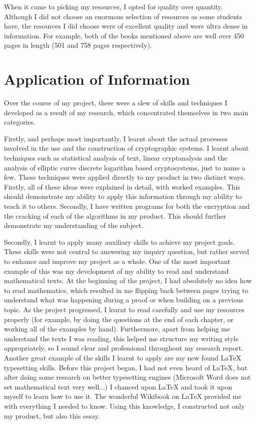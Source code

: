 \documentclass[12pt, a4paper, draft]{report}
\begin{document}
When it came to picking my resources, I opted for quality over quantity.
Although I did not choose an enormous selection of resources as some
students have, the resources I did choose were of excellent quality
and were ultra dense in information. For example, both of the books
mentioned above are well over 450 pages in length (501 and 758
pages respectively).

\section*{Application of Information}

Over the course of my project, there were a slew of skills and techniques
I developed as a result of my research, which concentrated themselves in
two main categories.

Firstly, and perhaps most importantly, I learnt about the actual processes
involved in the use and the construction of cryptographic systems. I
learnt about techniques such as statistical analysis of text, linear
cryptanalysis and the analysis of elliptic curve discrete logarithm based
cryptosystems, just to name a few. These techniques were applied directly
to my product in two distinct ways. Firstly, all of these ideas were explained in detail, with worked examples.
This should demonstrate my ability to apply this information through my
ability to teach it to others. Secondly, I have written programs for
both the encryption and the cracking of each of the algorithms in my
product. This should further demonstrate my understanding of the subject.

Secondly, I learnt to apply many auxiliary skills to achieve my project
goals. These skills were not central to answering my inquiry question, but
rather served to enhance and improve my project as a whole. One of the
most important example of this was my development of my ability to read
and understand mathematical texts. At the beginning of the project, I had
absolutely no idea how to read mathematics, which resulted in me flipping
back between pages trying to understand what was happening during a proof
or when building on a previous topic. As the project progressed, I learnt
to read carefully and use my resources properly (for example, by doing
the questions at the end of each chapter, or working all of the examples
by hand). Furthermore, apart from helping me understand the texts I was
reading, this helped me structure my writing style appropriately, so I
sound clear and professional throughout my research report. Another great
example of the skills I learnt to apply are my new found {\LaTeX} typesetting
skills. Before this project began, I had not even heard of {\LaTeX},
but after doing some research on better typesetting engines (Microsoft Word
does not set mathematical text very well...) I chanced upon {\LaTeX} and took
it upon myself to learn how to use it. The wonderful Wikibook on {\LaTeX}
provided me with everything I needed to know. Using this knowledge, I
constructed not only my product, but also this essay.
\end{document}
